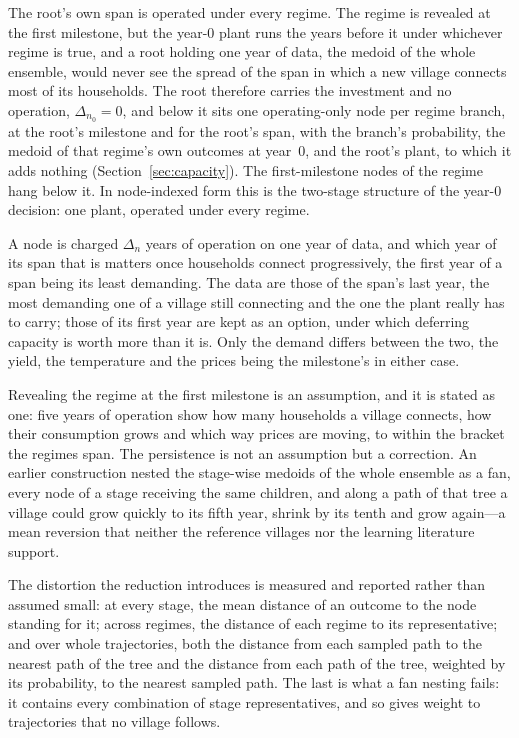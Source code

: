 \documentclass[11pt,a4paper]{article}
\theoremstyle{plain}
\theoremstyle{definition}
\begin{document}
The root's own span is operated under every regime. The regime is revealed at the first
milestone, but the year-0 plant runs the years before it under whichever regime is true, and
a root holding one year of data, the medoid of the whole ensemble, would never see the
spread of the span in which a new village connects most of its households. The root
therefore carries the investment and no operation, $\Delta_{n_0}=0$, and below it sits one
operating-only node per regime branch, at the root's milestone and for the root's span, with
the branch's probability, the medoid of that regime's own outcomes at year~0, and the root's
plant, to which it adds nothing (Section~\ref{sec:capacity}). The first-milestone nodes of
the regime hang below it. In node-indexed form this is the two-stage structure of the year-0
decision: one plant, operated under every regime.

A node is charged $\Delta_n$ years of operation on one year of data, and which year of its
span that is matters once households connect progressively, the first year of a span being
its least demanding. The data are those of the span's last year, the most demanding one of a
village still connecting and the one the plant really has to carry; those of its first year
are kept as an option, under which deferring capacity is worth more than it is. Only the
demand differs between the two, the yield, the temperature and the prices being the
milestone's in either case.

Revealing the regime at the first milestone is an assumption, and it is stated as one: five
years of operation show how many households a village connects, how their consumption grows
and which way prices are moving, to within the bracket the regimes span. The persistence is
not an assumption but a correction. An earlier construction nested the stage-wise medoids of
the whole ensemble as a fan, every node of a stage receiving the same children, and along a
path of that tree a village could grow quickly to its fifth year, shrink by its tenth and grow
again---a mean reversion that neither the reference villages nor the learning literature
support.

The distortion the reduction introduces is measured and reported rather than assumed small:
at every stage, the mean distance of an outcome to the node standing for it; across regimes,
the distance of each regime to its representative; and over whole trajectories, both the
distance from each sampled path to the nearest path of the tree and the distance from each
path of the tree, weighted by its probability, to the nearest sampled path. The last is what
a fan nesting fails: it contains every combination of stage representatives, and so gives
weight to trajectories that no village follows.
\end{document}
